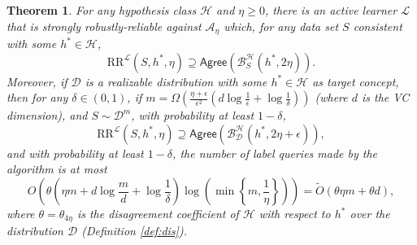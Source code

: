 \documentclass[11pt]{article}
\newcommand{\CR}{\text{RR}}
\newtheorem{theorem}{Theorem}[section]
\newcommand{\0}{\mathbf{0}}
\newcommand{\1}{\mathbf{1}}
\newcommand{\cA}{\mathcal{A}}
\newcommand{\cB}{\mathcal{B}}
\newcommand{\cD}{\mathcal{D}}
\newcommand{\cH}{\mathcal{H}}
\newcommand{\cL}{\mathcal{L}}
\newcommand{\Agree}{\mathsf{Agree}}
\begin{document}
\begin{theorem}
\label{thm:active-nasty-noise}
For any hypothesis class $\cH$ and $\eta \geq 0$,
there is an active learner $\cL$
that is strongly robustly-reliable against $\cA_\eta$
which,
for any data set $S$
consistent with some $h^* \in \cH$,
\begin{equation*}
\CR^{\cL}(S,h^*,\eta) \supseteq \Agree(\cB_S^\cH(h^*,2\eta)).
\end{equation*}
Moreover, if $\cD$ is a realizable distribution with some
$h^* \in \cH$ as target concept, then for any $\delta \in (0,1)$,
if $m = \Omega\!\left( \frac{\eta+\epsilon}{\epsilon^2} \left( d \log\frac{1}{\epsilon}+\log\frac{1}{\delta}\right) \right)$
(where $d$ is the VC dimension),
and $S \sim \cD^m$,
with probability at least $1-\delta$,
\begin{equation*}
\CR^{\cL}(S,h^*,\eta) \supseteq \Agree(\cB_\cD^\cH(h^*,2\eta+\epsilon)),
\end{equation*}
and with probability at least $1-\delta$,
the number of label queries made by the algorithm is
at most
\begin{equation*}
O\!\left( \theta \left( \eta m + d \log\frac{m}{d} + \log\frac{1}{\delta} \right)\log\!\left(\min\!\left\{m,\frac{1}{\eta}\right\}\right) \right) = \tilde{O}\!\left( \theta \eta m + \theta d \right),
\end{equation*}
where $\theta = \theta_{4\eta}$ is the disagreement coefficient of $\cH$ with respect to $h^*$ over the distribution $\cD$
(Definition \ref{def:dis}).
\end{theorem}
\end{document}
